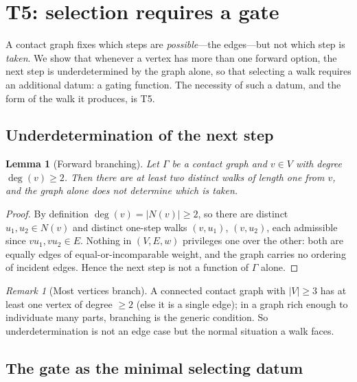 \documentclass[11pt,a4paper]{article}
\theoremstyle{thmstyle}
\newtheorem{lemma}[theorem]{Lemma}
\theoremstyle{definition}
\theoremstyle{remark}
\newtheorem{remark}[theorem]{Remark}
\newcommand{\Gph}{\Gamma}                 %
\newcommand{\V}{V}                        %
\newcommand{\E}{E}                        %
\newcommand{\wt}{w}                       %
\newcommand{\Nbr}{N}                      %
\newcommand{\abs}[1]{\lvert#1\rvert}
\begin{document}
\section{T5: selection requires a gate}
\label{sec:gating}

A contact graph fixes which steps are \emph{possible}---the edges---but not which
step is \emph{taken}. We show that whenever a vertex has more than one forward
option, the next step is underdetermined by the graph alone, so that selecting a
walk requires an additional datum: a gating function. The necessity of such a
datum, and the form of the walk it produces, is T5.

\subsection{Underdetermination of the next step}

\begin{lemma}[Forward branching]
\label{lem:branching}
Let $\Gph$ be a contact graph and $v\in\V$ with degree $\deg(v)\ge 2$. Then there
are at least two distinct walks of length one from $v$, and the graph alone does
not determine which is taken.
\end{lemma}

\begin{proof}
By definition $\deg(v)=\abs{\Nbr(v)}\ge2$, so there are distinct
$u_1,u_2\in\Nbr(v)$ and distinct one-step walks $(v,u_1)$, $(v,u_2)$, each
admissible since $vu_1,vu_2\in\E$. Nothing in $(\V,\E,\wt)$ privileges one over
the other: both are equally edges of equal-or-incomparable weight, and the graph
carries no ordering of incident edges. Hence the next step is not a function of
$\Gph$ alone.
\end{proof}

\begin{remark}[Most vertices branch]
\label{rem:branch-generic}
A connected contact graph with $\abs{\V}\ge3$ has at least one vertex of degree
$\ge2$ \textup{(}else it is a single edge\textup{)}; in a graph rich enough to
individuate many parts, branching is the generic condition. So
underdetermination is not an edge case but the normal situation a walk faces.
\end{remark}

\subsection{The gate as the minimal selecting datum}
\end{document}
